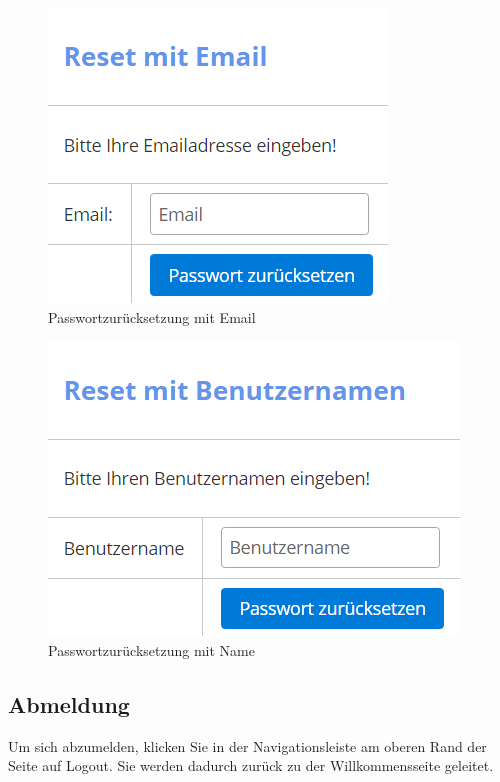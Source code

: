 \documentclass[enabledeprecatedfontcommands,fontsize=12pt,paper=a4,twoside]{scrartcl}
\begin{document}
\begin{figure}[h!]
\begin{center}
 \includegraphics[scale=0.6]{screenshots/allgemein/resetemail.png}
  \caption{Passwortzurücksetzung mit Email}
  \label{fig:boat1}
\end{center}
\end{figure}

\begin{figure}[h!]
\begin{center}
 \includegraphics[scale=0.6]{screenshots/allgemein/resetname.png}
  \caption{Passwortzurücksetzung mit Name}
  \label{fig:boat1}
\end{center}
\end{figure}



\subsection{Abmeldung}
Um sich abzumelden, klicken Sie in der Navigationsleiste am oberen Rand der Seite auf Logout. Sie werden dadurch zurück zu der Willkommensseite geleitet. \\
\end{document}
